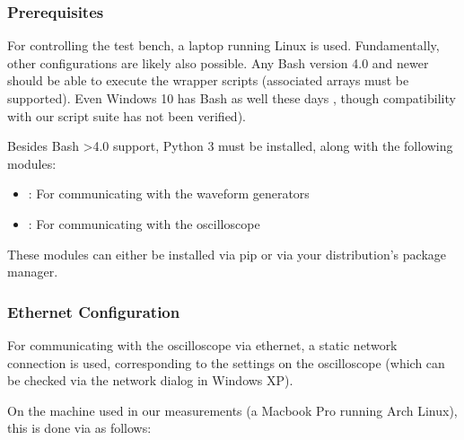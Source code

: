 \subsubsection{Prerequisites}
\label{subsubsec:laptop:prereqs}

For controlling the test bench, a laptop running Linux is used. Fundamentally,
other configurations are likely also  possible. Any Bash version 4.0 and newer
should  be able  to execute  the wrapper  scripts (associated  arrays must  be
supported). Even Windows 10  has Bash as well  these days \cite{ref:W10:bash},
though compatibility with our script suite has not been verified).

Besides  Bash  >4.0 support,  Python  3  must  be  installed, along  with  the
following modules:

\begin{itemize}\tightlist
    \item
        : For communicating with the waveform generators
    \item
        : For communicating with the oscilloscope
\end{itemize}

These  modules can  either be  installed via  pip or  via your  distribution's
package manager.


\subsubsection{Ethernet Configuration}
\label{subsubsec:laptop:netconf}

For  communicating  with  the  oscilloscope via  ethernet,  a  static  network
connection is used,  corresponding to the settings on  the oscilloscope (which
can be checked via the network dialog in Windows XP).

On the  machine used in our  measurements (a Macbook Pro  running Arch Linux),
this is done via  as follows\footnotemark:

